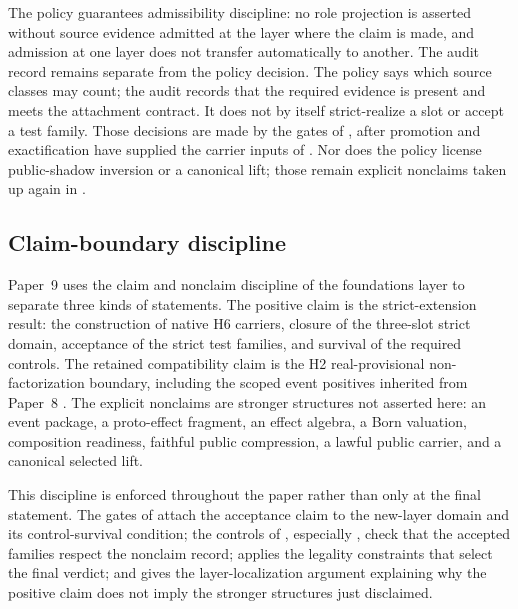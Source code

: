 \documentclass[11pt]{article}
\newcommand{\OldLayer}{H2}
\newcommand{\NewLayer}{H6}
\newcommand{\PaperNine}{Paper~9}
\newcommand{\PaperEight}{Paper~8}
\theoremstyle{definition}
\begin{document}
The policy guarantees admissibility discipline: no role projection is asserted
without source evidence admitted at the layer where the claim is made, and
admission at one layer does not transfer automatically to another.  The audit
record remains separate from the policy decision.  The policy says which source
classes may count; the audit records that the required evidence is present and
meets the attachment contract.  It does not by itself strict-realize a slot or
accept a test family.  Those decisions are made by the gates of
, after promotion and exactification have supplied
the carrier inputs of
.
Nor does the policy license public-shadow inversion or a canonical lift; those
remain explicit nonclaims taken up again in .

\subsection{Claim-boundary discipline}\label{subsec:pica-claim-boundary-report}

\PaperNine{} uses the claim and nonclaim discipline of the foundations layer
\cite{Tsiokos2026FoundationsII} to separate three kinds of statements.  The
positive claim is the strict-extension result: the construction of native
\NewLayer{} carriers, closure of the three-slot strict domain, acceptance of
the strict test families, and survival of the required controls.  The retained
compatibility claim is the \OldLayer{} real-provisional non-factorization
boundary, including the scoped event positives inherited from \PaperEight{}
\cite{Tsiokos2026CarrierToEvent}.  The explicit nonclaims are stronger
structures not asserted here: an event package, a proto-effect fragment, an
effect algebra, a Born valuation, composition readiness, faithful public
compression, a lawful public carrier, and a canonical selected lift.

This discipline is enforced throughout the paper rather than only at the final
statement.  The gates of  attach the acceptance claim
to the new-layer domain and its control-survival condition; the controls of
, especially
, check that the accepted families
respect the nonclaim record;  applies the legality
constraints that select the final verdict; and  gives the
layer-localization argument explaining why the positive claim does not imply
the stronger structures just disclaimed.
\end{document}
